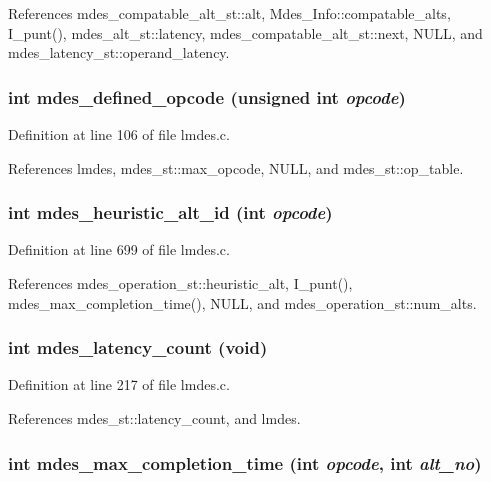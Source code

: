 References mdes\_\-compatable\_\-alt\_\-st::alt, Mdes\_\-Info::compatable\_\-alts, I\_\-punt(), mdes\_\-alt\_\-st::latency, mdes\_\-compatable\_\-alt\_\-st::next, NULL, and mdes\_\-latency\_\-st::operand\_\-latency.
\subsubsection{\setlength{\rightskip}{0pt plus 5cm}int mdes\_\-defined\_\-opcode (unsigned int {\em opcode})}\label{lmdes_8h_ac3528f18876ca767f050631903e3552}




Definition at line 106 of file lmdes.c.

References lmdes, mdes\_\-st::max\_\-opcode, NULL, and mdes\_\-st::op\_\-table.
\subsubsection{\setlength{\rightskip}{0pt plus 5cm}int mdes\_\-heuristic\_\-alt\_\-id (int {\em opcode})}\label{lmdes_8h_bcb6214dbe99b2a5c7b4fb47cc0b632e}




Definition at line 699 of file lmdes.c.

References mdes\_\-operation\_\-st::heuristic\_\-alt, I\_\-punt(), mdes\_\-max\_\-completion\_\-time(), NULL, and mdes\_\-operation\_\-st::num\_\-alts.
\subsubsection{\setlength{\rightskip}{0pt plus 5cm}int mdes\_\-latency\_\-count (void)}\label{lmdes_8h_7c180927e995b9efb844141769e8752a}




Definition at line 217 of file lmdes.c.

References mdes\_\-st::latency\_\-count, and lmdes.
\subsubsection{\setlength{\rightskip}{0pt plus 5cm}int mdes\_\-max\_\-completion\_\-time (int {\em opcode}, int {\em alt\_\-no})}\label{lmdes_8h_589f30951568d11531047a7b3404e6ac}




